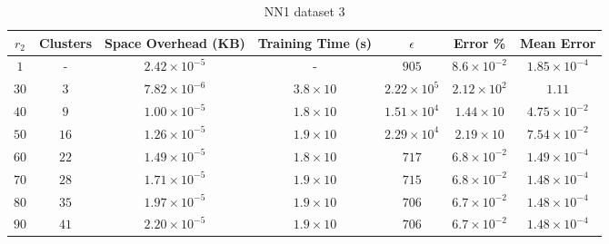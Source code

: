 \begin{adjustwidth}{-1cm}{}
\begin{table}
\caption{NN1 dataset 3}\label{ws110}
\begin{tabular}{ccccccc}
\hline
\toprule
$r_2$ & Clusters & Space Overhead (KB) & Training Time (s) & $\epsilon$ & Error \% & Mean Error\\
\midrule
$1$ & - & $2.42 \times 10^{-5}$ & - & $905$ & $8.6 \times 10^{-2}$ & $1.85 \times 10^{-4}$\\
$30$ & $3$ & $7.82 \times 10^{-6}$ & $3.8 \times 10$ & $2.22 \times 10^5$ & $2.12 \times 10^2$ & $1.11$\\
$40$ & $9$ & $1.00 \times 10^{-5}$ & $1.8 \times 10$ & $1.51 \times 10^4$ & $1.44 \times 10$ & $4.75 \times 10^{-2}$\\
$50$ & $16$ & $1.26 \times 10^{-5}$ & $1.9 \times 10$ & $2.29 \times 10^4$ & $2.19 \times 10$ & $7.54 \times 10^{-2}$\\
$60$ & $22$ & $1.49 \times 10^{-5}$ & $1.8 \times 10$ & $717$ & $6.8 \times 10^{-2}$ & $1.49 \times 10^{-4}$\\
$70$ & $28$ & $1.71 \times 10^{-5}$ & $1.9 \times 10$ & $715$ & $6.8 \times 10^{-2}$ & $1.48 \times 10^{-4}$\\
$80$ & $35$ & $1.97 \times 10^{-5}$ & $1.9 \times 10$ & $706$ & $6.7 \times 10^{-2}$ & $1.48 \times 10^{-4}$\\
$90$ & $41$ & $2.20 \times 10^{-5}$ & $1.9 \times 10$ & $706$ & $6.7 \times 10^{-2}$ & $1.48 \times 10^{-4}$\\
\bottomrule
\end{tabular}
\end{table}
\end{adjustwidth}

\par\null\par
\par\null\par

